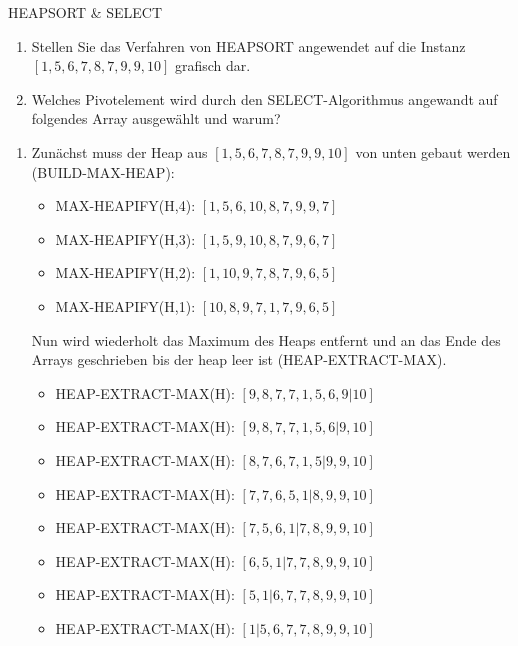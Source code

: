 \documentclass{article}
\begin{document}
\begin{exercise}{HEAPSORT \& SELECT}
  \begin{enumerate}
    \item Stellen Sie das Verfahren von HEAPSORT angewendet auf die Instanz $[1,5,6,7,8,7,9,9,10]$ grafisch dar.
    \item Welches Pivotelement wird durch den SELECT-Algorithmus angewandt auf folgendes Array ausgewählt und warum?
          \begin{equation*}
            [8,22,2,6,15,11,12,1,13,9,7,55,3,30,41]
          \end{equation*}
  \end{enumerate}

  \begin{solution}
    \begin{enumerate}
      \item Zunächst muss der Heap aus $[1, 5,6, 7,8,7,9, 9,10]$ von unten gebaut werden (BUILD-MAX-HEAP):
            \begin{itemize}
              \item MAX-HEAPIFY(H,4): $[1, 5,6, 10,8,7,9, 9,7]$
              \item MAX-HEAPIFY(H,3): $[1, 5,9, 10,8,7,9, 6,7]$
              \item MAX-HEAPIFY(H,2): $[1, 10,9, 7,8,7,9, 6,5]$
              \item MAX-HEAPIFY(H,1): $[10, 8,9, 7,1,7,9, 6,5]$
            \end{itemize}
            Nun wird wiederholt das Maximum des Heaps entfernt und an das Ende des Arrays geschrieben bis der heap leer ist (HEAP-EXTRACT-MAX).
            \begin{itemize}
              \item HEAP-EXTRACT-MAX(H): $[9, 8,7, 7,1,5,6, 9|10]$
              \item HEAP-EXTRACT-MAX(H): $[9, 8,7, 7,1,5,6|9,10]$
              \item HEAP-EXTRACT-MAX(H): $[8, 7,6, 7,1,5|9,9,10]$
              \item HEAP-EXTRACT-MAX(H): $[7, 7,6, 5,1|8,9,9,10]$
              \item HEAP-EXTRACT-MAX(H): $[7, 5,6, 1|7,8,9,9,10]$
              \item HEAP-EXTRACT-MAX(H): $[6, 5,1|7,7,8,9,9,10]$
              \item HEAP-EXTRACT-MAX(H): $[5, 1|6,7,7,8,9,9,10]$
              \item HEAP-EXTRACT-MAX(H): $[1|5,6,7,7,8,9,9,10]$

\end{itemize}
\end{enumerate}
\end{solution}
\end{exercise}
\end{document}
